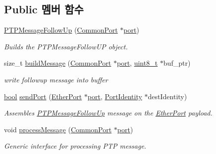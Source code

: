 \subsection*{Public 멤버 함수}
\begin{DoxyCompactItemize}
\item 
\hyperlink{class_p_t_p_message_follow_up_ac4fc9523438a584fc9efa0d5e6a3ce14}{P\+T\+P\+Message\+Follow\+Up} (\hyperlink{class_common_port}{Common\+Port} $\ast$\hyperlink{gst__avb__playbin_8c_a63c89c04d1feae07ca35558055155ffb}{port})
\begin{DoxyCompactList}\small\item\em Builds the P\+T\+P\+Message\+Follow\+UP object. \end{DoxyCompactList}\item 
size\+\_\+t \hyperlink{class_p_t_p_message_follow_up_a70eeb75d3cca051e5581f430b88192a8}{build\+Message} (\hyperlink{class_common_port}{Common\+Port} $\ast$\hyperlink{gst__avb__playbin_8c_a63c89c04d1feae07ca35558055155ffb}{port}, \hyperlink{stdint_8h_aba7bc1797add20fe3efdf37ced1182c5}{uint8\+\_\+t} $\ast$buf\+\_\+ptr)
\begin{DoxyCompactList}\small\item\em write followup message into buffer \end{DoxyCompactList}\item 
\hyperlink{avb__gptp_8h_af6a258d8f3ee5206d682d799316314b1}{bool} \hyperlink{class_p_t_p_message_follow_up_a0c6f07200fa46634360d356ebb10dfe0}{send\+Port} (\hyperlink{class_ether_port}{Ether\+Port} $\ast$\hyperlink{gst__avb__playbin_8c_a63c89c04d1feae07ca35558055155ffb}{port}, \hyperlink{class_port_identity}{Port\+Identity} $\ast$dest\+Identity)
\begin{DoxyCompactList}\small\item\em Assembles \hyperlink{class_p_t_p_message_follow_up}{P\+T\+P\+Message\+Follow\+Up} message on the \hyperlink{class_ether_port}{Ether\+Port} payload. \end{DoxyCompactList}\item 
void \hyperlink{class_p_t_p_message_follow_up_a45670a42f5684252d52543f9ed3a1551}{process\+Message} (\hyperlink{class_common_port}{Common\+Port} $\ast$\hyperlink{gst__avb__playbin_8c_a63c89c04d1feae07ca35558055155ffb}{port})
\begin{DoxyCompactList}\small\item\em Generic interface for processing P\+TP message. \end{DoxyCompactList}\item 

\end{DoxyCompactItemize}
